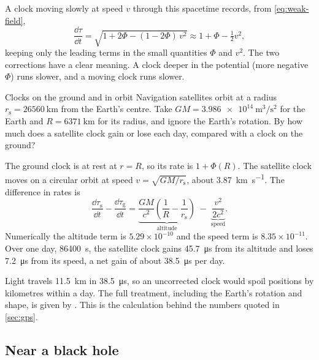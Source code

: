 A clock moving slowly at speed $v$ through this spacetime records, from
\cref{eq:weak-field},
\begin{equation}
  \frac{\dd\tau}{\dd t} = \sqrt{1 + 2\Phi - (1 - 2\Phi)\,v^{2}}
  \approx 1 + \Phi - \tfrac{1}{2}v^{2},
  \label{eq:clock-rate}
\end{equation}
keeping only the leading terms in the small quantities $\Phi$ and $v^{2}$. The
two corrections have a clear meaning. A clock deeper in the potential (more
negative $\Phi$) runs slower, and a moving clock runs slower.

\begin{example}{Clocks on the ground and in orbit}\label{ex:gps}
Navigation satellites orbit at a radius $r_{\mathrm{s}} = \SI{26560}{\kilo\metre}$
from the Earth's centre. Take $GM = \SI{3.986e14}{\metre\cubed\per\second\squared}$
for the Earth and $R = \SI{6371}{\kilo\metre}$ for its radius, and ignore the
Earth's rotation. By how much does a satellite clock gain or lose each day,
compared with a clock on the ground?

\solution The ground clock is at rest at $r = R$, so its rate is
$1 + \Phi(R)$. The satellite clock moves on a circular orbit at speed
$v = \sqrt{GM/r_{\mathrm{s}}}$, about \SI{3.87}{\kilo\metre\per\second}. The
difference in rates is
\begin{equation*}
  \frac{\dd\tau_{\mathrm{s}}}{\dd t} - \frac{\dd\tau_{\mathrm{g}}}{\dd t}
  = \underbrace{\frac{GM}{c^{2}}\left(\frac{1}{R} - \frac{1}{r_{\mathrm{s}}}\right)}_{\text{altitude}}
  \; - \; \underbrace{\frac{v^{2}}{2c^{2}}}_{\text{speed}} .
\end{equation*}
Numerically the altitude term is $5.29\times10^{-10}$ and the speed term is
$8.35\times10^{-11}$. Over one day, \SI{86400}{\second}, the satellite clock
gains \SI{45.7}{\micro\second} from its altitude and loses
\SI{7.2}{\micro\second} from its speed, a net gain of about
\SI{38.5}{\micro\second} per day.

\discussion Light travels \SI{11.5}{\kilo\metre} in \SI{38.5}{\micro\second},
so an uncorrected clock would spoil positions by kilometres within a day. The
full treatment, including the Earth's rotation and shape, is given by
\textcite{Ashby2003}. This is the calculation behind the numbers quoted in
\cref{sec:gps}.
\end{example}

\subsection{Near a black hole}

